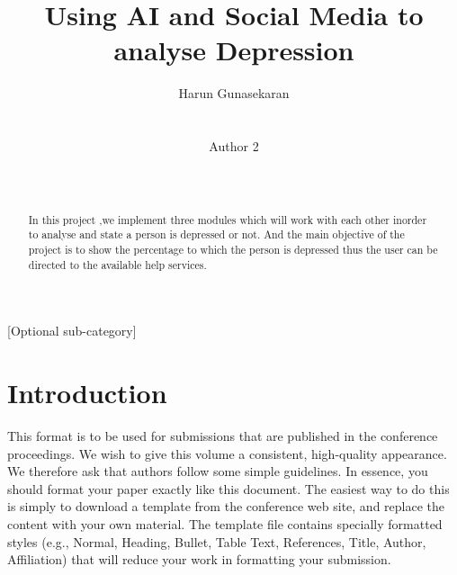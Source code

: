 \documentclass{chi2009}
\begin{document}
\setlength{\paperheight}{11in}
\setlength{\paperwidth}{8.5in}
\setlength{\pdfpageheight}{\paperheight}
\setlength{\pdfpagewidth}{\paperwidth}


\title{Using AI and Social Media to analyse Depression}
\author{
  \alignauthor Harun Gunasekaran\\
    \\
    \\
  \alignauthor Author 2\\
    \\
    \\
}

\maketitle

\begin{abstract}
  In this project ,we implement three modules which will work with 
 each other inorder to analyse and state a person is 
 depressed or not. And the main objective of the project is to show
 the percentage to which the person is depressed 
 thus the user can be directed to the available help services.
\end{abstract}


[Optional sub-category]

\section{Introduction}

This format is to be used for submissions that are published in the
conference proceedings.  We wish to give this volume a consistent,
high-quality appearance. We therefore ask that authors follow some
simple guidelines. In essence, you should format your paper exactly
like this document. The easiest way to do this is simply to download a
template from the conference web site, and replace the content with
your own material. The template file contains specially formatted
styles (e.g., Normal, Heading, Bullet, Table Text, References, Title,
Author, Affiliation) that will reduce your work in formatting your
submission.
\end{document}
